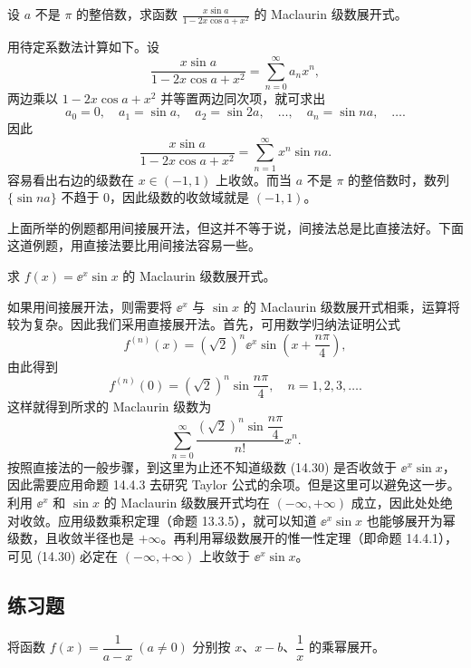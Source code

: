 \begin{xexample}[14.4.5]
设 $a$ 不是 $\pi$ 的整倍数，求函数 $\displaystyle\frac{x\sin a}{1-2x\cos a+x^2}$ 的 Maclaurin 级数展开式。
\end{xexample}
\begin{xsolution}
用待定系数法计算如下。设
\[
  \frac{x\sin a}{1-2x\cos a+x^2}=\sum_{n=0}^{\infty}a_nx^n,
\]
两边乘以 $1-2x\cos a+x^2$ 并等置两边同次项，就可求出
\[
  a_0=0,\quad a_1=\sin a,\quad a_2=\sin2a,\quad\ldots,\quad a_n=\sin na,\quad\ldots.
\]
因此
\[
  \frac{x\sin a}{1-2x\cos a+x^2}=\sum_{n=1}^{\infty}x^n\sin na.
\]
容易看出右边的级数在 $x\in(-1,1)$ 上收敛。而当 $a$ 不是 $\pi$ 的整倍数时，数列 $\{\sin na\}$ 不趋于 $0$，因此级数的收敛域就是 $(-1,1)$。
\end{xsolution}

上面所举的例题都用间接展开法，但这并不等于说，间接法总是比直接法好。下面这道例题，用直接法要比用间接法容易一些。

\begin{xexample}[14.4.6]
求 $f(x)=\ee^x\sin x$ 的 Maclaurin 级数展开式。
\end{xexample}
\begin{xsolution}
如果用间接展开法，则需要将 $\ee^x$ 与 $\sin x$ 的 Maclaurin 级数展开式相乘，运算将较为复杂。因此我们采用直接展开法。首先，可用数学归纳法证明公式
\[
  f^{(n)}(x)=(\sqrt2)^n\ee^x\sin\left(x+\frac{n\pi}{4}\right),
\]
由此得到
\[
  f^{(n)}(0)=(\sqrt2)^n\sin\frac{n\pi}{4},\quad n=1,2,3,\ldots.
\]
这样就得到所求的 Maclaurin 级数为
\begin{equation}
  \sum_{n=0}^{\infty}\frac{(\sqrt2)^n\sin\dfrac{n\pi}{4}}{n!}x^n.
  \tag{14.30}
  \label{eq:14.30}
\end{equation}
按照直接法的一般步骤，到这里为止还不知道级数 (14.30) 是否收敛于 $\ee^x\sin x$，因此需要应用命题 14.4.3 去研究 Taylor 公式的余项。但是这里可以避免这一步。利用 $\ee^x$ 和 $\sin x$ 的 Maclaurin 级数展开式均在 $(-\infty,+\infty)$ 成立，因此处处绝对收敛。应用级数乘积定理（命题 13.3.5），就可以知道 $\ee^x\sin x$ 也能够展开为幂级数，且收敛半径也是 $+\infty$。再利用幂级数展开的惟一性定理（即命题 14.4.1），可见 (14.30) 必定在 $(-\infty,+\infty)$ 上收敛于 $\ee^x\sin x$。
\end{xsolution}

\subsection{练习题}

\begin{xexercise}[1]
将函数 $f(x)=\dfrac1{a-x}\ (a\ne0)$ 分别按 $x$、$x-b$、$\dfrac1x$ 的乘幂展开。
\end{xexercise}

